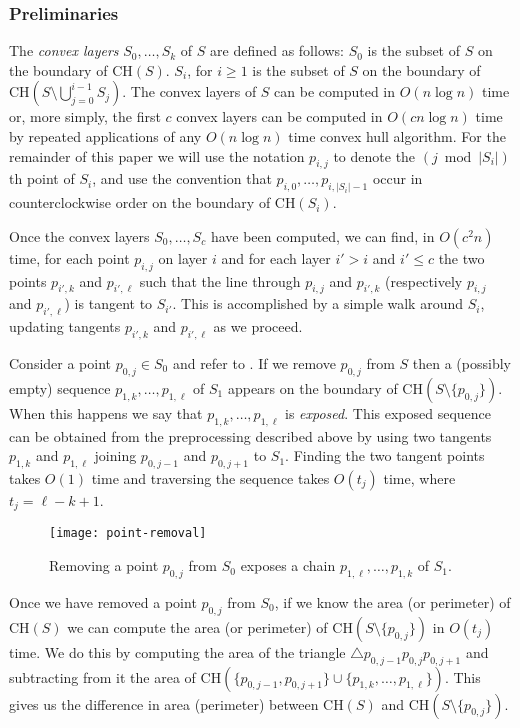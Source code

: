 \documentclass[lotsofwhite]{patmorin}
\newcommand{\ch}{\mathrm{CH}}
\begin{document}
\subsubsection{Preliminaries} 

The \emph{convex layers} $S_0,\ldots,S_k$ of $S$ are defined as
follows: $S_0$ is the subset of $S$ on the boundary of $\ch(S)$.
$S_i$, for $i\ge 1$ is the subset of $S$ on the boundary of
$\ch(S\setminus\bigcup_{j=0}^{i-1} S_j)$.  The convex layers of $S$
can be computed in $O(n\log n)$ time \cite{c85,hs92} or, more simply,
the first $c$ convex layers can be computed in $O(cn\log n)$ time by
repeated applications of any $O(n\log n)$ time convex hull algorithm.
For the remainder of this paper we will use the notation $p_{i,j}$ to
denote the $(j\bmod |S_i|)$th point of $S_i$, and use the convention
that $p_{i,0},\ldots,p_{i,|S_i|-1}$ occur in counterclockwise order on
the boundary of $\ch(S_i)$.

Once the convex layers $S_0,\ldots,S_c$ have been computed, we can
find, in $O(c^2 n)$ time, for each point $p_{i,j}$ on layer $i$ and
for each layer $i'> i$ and $i'\le c$ the two points $p_{i',k}$ and
$p_{i',\ell}$ such that the line through $p_{i,j}$ and $p_{i',k}$
(respectively $p_{i,j}$ and $p_{i',\ell}$) is tangent to $S_{i'}$.
This is accomplished by a simple walk around $S_i$, updating tangents
$p_{i',k}$ and $p_{i',\ell}$ as we proceed.

Consider a point $p_{0,j}\in S_0$ and refer to .
If we remove $p_{0,j}$ from $S$ then a (possibly empty) sequence
$p_{1,k},\ldots,p_{1,\ell}$ of $S_1$ appears on the boundary of
$\ch(S\setminus\{p_{0,j}\})$.  When this happens we say that
$p_{1,k},\ldots,p_{1,\ell}$ is \emph{exposed}.  This exposed sequence
can be obtained from the preprocessing described above by using two
tangents $p_{1,k}$ and $p_{1,\ell}$ joining $p_{0,j-1}$ and
$p_{0,j+1}$ to $S_1$.  Finding the two tangent points takes $O(1)$
time and traversing the sequence takes $O(t_j)$ time, where
$t_j=\ell-k+1$.

\begin{figure}
\begin{center}\texttt{[image: point-removal]}\end{center}
\caption{Removing a point $p_{0,j}$ from $S_0$ exposes a chain
$p_{1,\ell},\ldots,p_{1,k}$ of $S_1$.}
\end{figure}

Once we have removed a point $p_{0,j}$ from $S_0$, if we know the area
(or perimeter) of $\ch(S)$ we can compute the area (or perimeter) of
$\ch(S\setminus\{p_{0,j}\})$ in $O(t_j)$ time.  We do this by
computing the area of the triangle $\triangle
p_{0,j-1}p_{0,j}p_{0,j+1}$ and subtracting from it the area of
$\ch(\{p_{0,j-1},p_{0,j+1}\}\cup\{p_{1,k},\ldots,p_{1,\ell}\})$.  This
gives us the difference in area (perimeter) between $\ch(S)$ and
$\ch(S\setminus\{p_{0,j}\})$.
\end{document}
